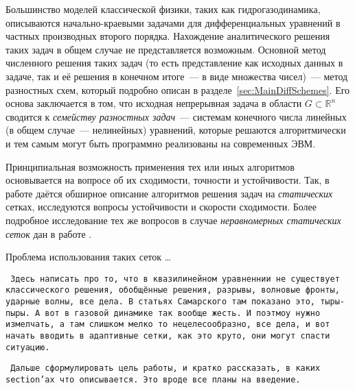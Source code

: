 Большинство моделей классической физики, таких как гидрогазодинамика, описываются начально-краевыми задачами для дифференциальных уравнений в частных производных второго порядка\cite{ТихоновСамарский, ЛандауГидродинамика}.
Нахождение аналитического решения таких задач в общем случае не представляется возможным.
Основной метод численного решения таких задач (то есть представление как исходных данных в задаче, так и её решения в конечном итоге~--- в виде множества чисел)~--- метод разностных схем, который подробно описан в разделе~\ref{sec:MainDiffSchemes}.
Его основа заключается в том, что исходная непрерывная задача в области $G \subset \mathbb{R}^n$ сводится к \emph{семейству разностных задач}~--- системам конечного числа линейных (в общем случае~--- нелинейных) уравнений, которые решаются алгоритмически и тем самым могут быть программно реализованы на современных ЭВМ.

Принципиальная возможность применения тех или иных алгоритмов основывается на вопросе об их сходимости, точности и устойчивости.
Так, в работе \cite{СамарскийТеорияРазностныхСхем} даётся обширное описание алгоритмов решения задач на \emph{статических} сетках, исследуются вопросы устойчивости и скорости сходимости.
Более подробное исследование тех же вопросов в случае \emph{неравномерных статических сеток} дан в работе \cite{СамарскийНеравномерныеСетки}.

Проблема использования таких сеток \ldots

\texttt{
    Здесь написать про то, что в квазилинейном уравненнии не существует классического решения, обобщённые решения, разрывы, волновые фронты, ударные волны, все дела. В статьях Самарского там показано это, тыры-пыры. А вот в газовой динамике так вообще жесть. И поэтмоу нужно измелчать, а там слишком мелко то нецелесообразно, все дела, и вот начать вводить в адаптивные сетки, как это круто, они могут спасти ситуацию.
}

\texttt{
    Дальше сформулировать цель работы, и кратко рассказать, в каких section'ах что описывается. Это вроде все планы на введение.
}